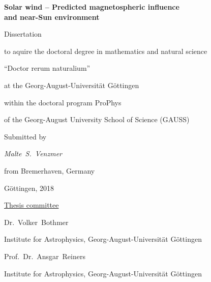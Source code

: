 
\begin{titlepage}
	\begin{center}
		\vspace*{\fill}
		\renewcommand{\baselinestretch}{1.5}
		{\LARGE\sffamily
			\textbf{Solar wind -- Predicted magnetospheric influence\\and near-Sun environment}\\
		}
		
		\vspace{3\baselineskip}
		\Large\rmfamily
		Dissertation
		
		to aquire the doctoral degree in mathematics and natural science	%
		
		``Doctor rerum naturalium''
		
		at the Georg-August-Universität Göttingen
		
		\vspace{\baselineskip}
		within the doctoral program ProPhys
		
		of the Georg-August University School of Science (GAUSS)
		
		\vspace{4\baselineskip}
		Submitted by
		
		\textit{%
			Malte~S.~Venzmer
		}
		
		from Bremerhaven, Germany
		
		\vspace{4\baselineskip}
		Göttingen, 2018
		\vspace{\baselineskip}
		\vspace{\fill}
	\end{center}
\end{titlepage}

\newpage


\vspace*{\fill}

\noindent \underline{Thesis committee}
\vspace{\baselineskip}

Dr.~Volker~Bothmer

Institute for Astrophysics, Georg-August-Universität Göttingen
\vspace{\baselineskip}

Prof.~Dr.~Ansgar~Reiners

Institute for Astrophysics, Georg-August-Universität Göttingen
% 
\vspace{3\baselineskip}


